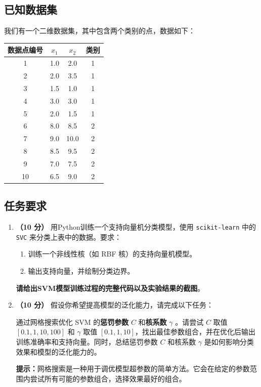 \documentclass[8pt]{article}
\begin{document}
\subsection*{已知数据集}

我们有一个二维数据集，其中包含两个类别的点，数据如下：

\begin{table}[h]
    \centering
    \begin{tabular}{|c|c|c|c|}
        \hline
        数据点编号 & \(x_1\) & \(x_2\) & 类别 \\
        \hline
        1 & 1.0 & 2.0 & 1 \\
        2 & 2.0 & 3.5 & 1 \\
        3 & 1.5 & 1.0 & 1 \\
        4 & 3.0 & 3.0 & 1 \\
        5 & 2.0 & 1.5 & 1 \\
        6 & 8.0 & 8.5 & 2 \\
        7 & 9.0 & 10.0 & 2 \\
        8 & 8.5 & 9.5 & 2 \\
        9 & 7.0 & 7.5 & 2 \\
        10 & 6.5 & 9.0 & 2 \\
        \hline
    \end{tabular}
\end{table}

\subsection*{任务要求}

\begin{enumerate}
    \item \textbf{（10 分）} 用Python训练一个支持向量机分类模型，使用 \texttt{scikit-learn} 中的 \texttt{SVC} 来分类上表中的数据。要求：
    \begin{enumerate}
        \item 训练一个非线性核（如 RBF 核）的支持向量机模型。
        \item 输出支持向量，并绘制分类边界。
    \end{enumerate}

    \textbf{请给出SVM模型训练过程的完整代码以及实验结果的截图}。

    \item \textbf{（10 分）} 假设你希望提高模型的泛化能力，请完成以下任务：

    通过网格搜索优化 SVM 的\textbf{惩罚参数} \(C\) 和\textbf{核系数} \( \gamma \) 。请尝试 \( C \) 取值 \([0.1, 1, 10, 100]\) 和 \( \gamma \) 取值 \([0.1, 1, 10]\)，找出最佳参数组合，并在优化后输出训练准确率和支持向量。同时，总结惩罚参数 \(C\) 和核系数 \( \gamma \) 是如何影响分类效果和模型的泛化能力的。

    \textbf{提示：}网格搜索是一种用于调优模型超参数的简单方法。它会在给定的参数范围内尝试所有可能的参数组合，选择效果最好的组合。
\end{enumerate}
\end{document}
